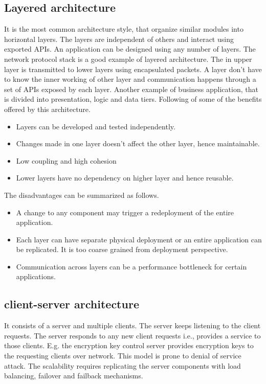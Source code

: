 \documentclass[conference]{IEEEtran}
\begin{document}
\subsection{Layered architecture}
It is the most common architecture style, that organize similar modules into horizontal layers. The layers are independent of others and interact using exported APIs. An application can be designed using any number of layers. The network protocol stack is a good example of layered architecture. The in upper layer is transmitted to lower layers using encapsulated packets. A layer don't have to know the inner working of other layer and communication happens through a set of APIs exposed by each layer. Another example of business application, that is divided into presentation, logic and data tiers. Following of some of the benefits offered by this architecture.
\begin{itemize}
\item Layers can be developed and tested independently.
\item Changes made in one layer doesn't affect the other layer, hence maintainable.
\item Low coupling and high cohesion
\item Lower layers have no dependency on higher layer and hence reusable.
\end{itemize}

The disadvantages can be summarized as follows.
\begin{itemize}
\item A change to any component may trigger a redeployment of the entire application.
\item Each layer can have separate physical deployment or an entire application can be replicated. It is too coarse grained from deployment perspective.
\item Communication across layers can be a performance bottleneck for certain applications.
\end{itemize}

\subsection{client-server architecture}
It consists of a server and multiple clients. The server keeps listening to the client requests. The server responds to any new client requests i.e., provides a service to those clients.
E.g. the encryption key control server \cite{hytrust} provides encryption keys to the requesting clients over network. This model is prone to denial of service attack. The scalability requires replicating the server components with load balancing, failover and failback mechanisms.
\end{document}
